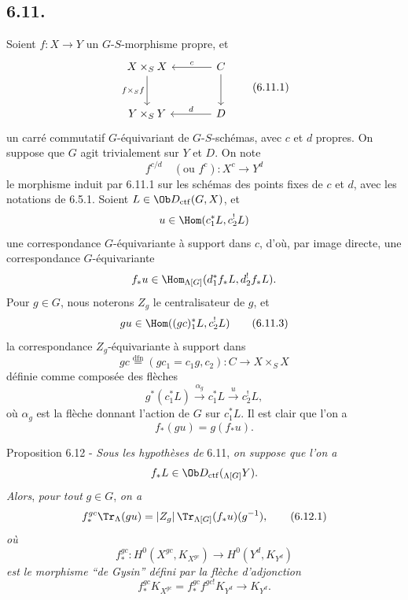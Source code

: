 \subsection*{6.11.}
Soient $f:X\to Y$ un $G$-$S$-morphisme propre, et
\begin{equation}
\begin{tikzcd}[column sep=large,row sep=large]
X\times_SX \arrow[d,"f\times_Sf"'] & C \arrow[l,"c"'] \arrow[d]\\
Y\times_SY & D \arrow[l,"d"']
\end{tikzcd}
\tag{6.11.1}
\end{equation}
un carré commutatif $G$-équivariant de $G$-$S$-schémas, avec $c$ et $d$ propres. On suppose que $G$ agit trivialement sur $Y$ et $D$. On note
\begin{equation}
f^{c/d}\quad(\text{ou } f^c):X^c\longrightarrow Y^d
\tag{6.11.2}
\end{equation}
le
morphisme induit par 6.11.1 sur les schémas des points fixes de $c$ et $d$, avec les notations de 6.5.1. Soient $L\in\Ob D_{\mathrm{ctf}}(G,X)$, et
\[
u\in\Hom(c_1^*L,c_2^!L)
\]
une correspondance $G$-équivariante à support dans $c$, d'où, par image directe, une correspondance $G$-équivariante
\[
f_*u\in\Hom_{\Lambda[G]}(d_1^*f_*L,d_2^!f_*L).
\]
Pour $g\in G$, nous noterons $Z_g$ le centralisateur de $g$, et
\begin{equation}
gu\in\Hom((gc)_1^*L,c_2^!L)
\tag{6.11.3}
\end{equation}
la correspondance $Z_g$-équivariante à support dans
\begin{equation}
gc\stackrel{\mathrm{dfn}}{=}(gc_1=c_1g,c_2):C\to X\times_SX
\tag{6.11.4}
\end{equation}
définie comme composée des flèches
\[
g^*(c_1^*L)\xrightarrow{\alpha_g}c_1^*L\xrightarrow{u}c_2^!L,
\]
où $\alpha_g$ est la flèche donnant l'action de $G$ sur $c_1^*L$. Il est clair que l'on a
\begin{equation}
f_*(gu)=g(f_*u).
\tag{6.11.5}
\end{equation}

\begin{statement}{Proposition 6.12 -}
\emph{Sous les hypothèses de} 6.11, \emph{on suppose que l'on a}
\[
f_*L\in\Ob D_{\mathrm{ctf}}({}_{\Lambda[G]}Y).
\]
\emph{Alors}, \emph{pour tout} $g\in G$, \emph{on a}
\begin{equation}
f_*^{gc}\Tr_{\Lambda}(gu)
=
|Z_g|\,\Tr_{\Lambda[G]}(f_*u)(g^{-1}),
\tag{6.12.1}
\end{equation}
\emph{où}
\[
f_*^{gc}:H^0(X^{gc},K_{X^{gc}})\longrightarrow H^0(Y^d,K_{Y^d})
\]
\emph{est le morphisme ``de Gysin'' défini par la flèche d'adjonction}
\[
f_*^{gc}K_{X^{gc}}=f_*^{gc}f^{gc!}K_{Y^d}\longrightarrow K_{Y^d}.
\]
\end{statement}

